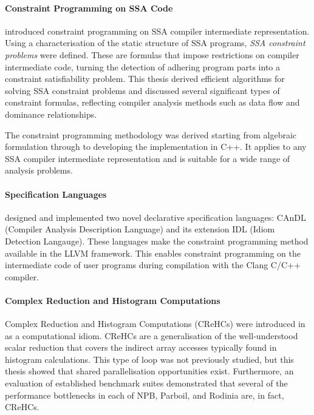     \paragraph*{Constraint Programming on SSA Code}
     introduced constraint programming on
    SSA compiler intermediate representation.
    Using a characterisation of the static structure of SSA programs,
    {\it SSA constraint problems} were defined.
    These are formulas that impose restrictions on compiler intermediate code,
    turning the detection of adhering program parts into a constraint
    satisfiability problem.
    This thesis derived efficient algorithms for solving SSA constraint problems
    and discussed several significant types of constraint formulas, reflecting
    compiler analysis methods such as data flow and dominance relationships.

    The constraint programming methodology was derived starting from algebraic
    formulation through to developing the implementation in C++.
    It applies to any SSA compiler intermediate representation and is suitable
    for a wide range of analysis problems.

    \paragraph*{Specification Languages}
     designed and implemented two novel
    declarative specification languages: CAnDL (Compiler Analysis
    Description Language) and its extension IDL (Idiom Detection Langauge).
    These languages make the constraint programming method available in the
    LLVM framework.
    This enables constraint programming on the intermediate code of user
    programs during compilation with the Clang C/C++ compiler.

    \paragraph*{Complex Reduction and Histogram Computations}
    Complex Reduction and Histogram Computations (CReHCs) were introduced in
     as a computational idiom.
    CReHCs are a generalisation of the well-understood scalar reduction that
    covers the indirect array accesses typically found in histogram
    calculations.
    This type of loop was not previously studied, but this thesis showed that
    shared parallelisation opportunities exist.
    Furthermore, an evaluation of established benchmark suites demonstrated
    that several of the performance bottlenecks in each of NPB, Parboil, and
    Rodinia are, in fact,  CReHCs.

